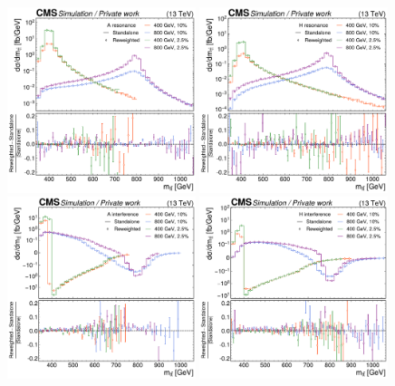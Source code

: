 \begin{figure}[!p]
    \centering
    \includegraphics[width=0.49\textwidth]{figures/ah/me_reweighting/A_res.pdf}
    \hfill
    \includegraphics[width=0.49\textwidth]{figures/ah/me_reweighting/H_res.pdf}
    \includegraphics[width=0.49\textwidth]{figures/ah/me_reweighting/A_int.pdf}
    \hfill
    \includegraphics[width=0.49\textwidth]{figures/ah/me_reweighting/H_int.pdf}

\end{figure}
